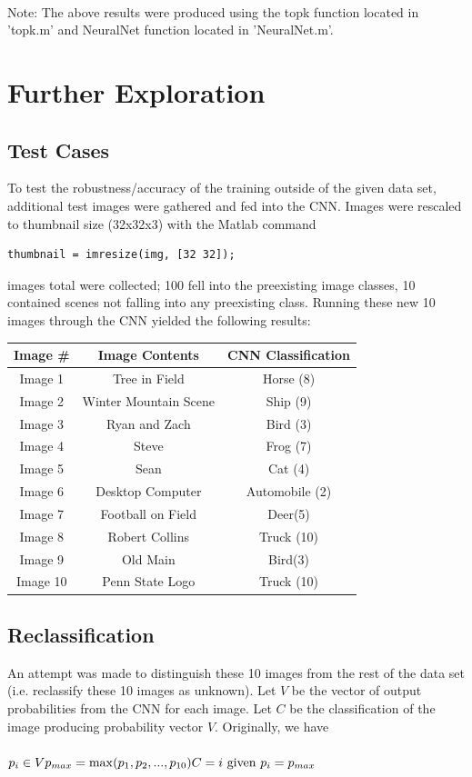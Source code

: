 \documentclass[11pt,english]{article}
\begin{document}
	~\\
	\noindent
	Note: The above results were produced using the topk function located in 'topk.m' and NeuralNet function located in 'NeuralNet.m'.

\section{Further Exploration}
\subsection{Test Cases}
To test the robustness/accuracy of the training outside of the given data set, additional test images were gathered and fed into the CNN.  Images were rescaled to thumbnail size (32x32x3) with the Matlab command
\begin{lstlisting}
thumbnail = imresize(img, [32 32]);
\end{lstlisting}

 images total were collected; 100 fell into the preexisting image classes, 10 contained scenes not falling into any preexisting class.  Running these new 10 images through the CNN yielded the following results:\\

\begin{tabular}{ | c | c | c |}
  \hline
  Image \# & Image Contents & CNN Classification \\
  \hline		
  Image 1 & Tree in Field & Horse (8) \\
  Image 2 & Winter Mountain Scene & Ship (9) \\
  Image 3 & Ryan and Zach & Bird (3) \\
  Image 4 & Steve & Frog (7) \\
  Image 5 & Sean & Cat (4) \\
  Image 6 & Desktop Computer & Automobile (2) \\
  Image 7 & Football on Field & Deer(5) \\
  Image 8 & Robert Collins & Truck (10) \\
  Image 9 & Old Main & Bird(3) \\
  Image 10 & Penn State Logo & Truck (10)\\
  \hline  
\end{tabular}

\subsection{Reclassification}
An attempt was made to distinguish these 10 images from the rest of the data set (i.e. reclassify these 10 images as unknown).  Let $V$ be the vector of output probabilities from the CNN for each image.  Let $C$ be the classification of the image producing probability vector $V$.  Originally, we have\\~\\
\begin{math}
p_i \in V \\
p_{max} = \max(p_1, p_2,...,p_{10}) \\
C = i $ given $ p_i = p_{max}
\end{math}
\end{document}
